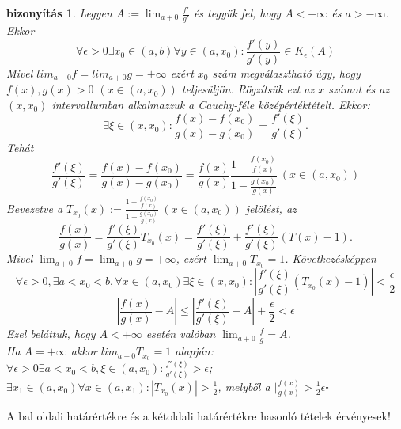 \documentclass{article}
\newcommand{\ob}{\hfill$\square$}
\newcommand{\di}{\displaystyle}
\theoremstyle{magyar}
\newtheorem{bi}{bizonyítás}[section]
\begin{document}
  \begin{bi}
    Legyen $A:=\di\lim_{a+0}\frac{f'}{g'}$ és tegyük fel, hogy $A<+\infty$ és 
    $a>-\infty$. Ekkor
    \[\forall\epsilon>0\exists x_0\in(a,b)\forall y\in(a,x_0):\frac{f'(y)}{g'(y)}\in K_\epsilon(A) \]
    Mivel $\di lim_{a+0}f=lim_{a+0}g=+\infty$ ezért $x_0$ szám megválasztható úgy, 
    hogy $f(x),g(x)>0$ $(x\in(a,x_0))$ teljesüljön. Rögzítsük ezt az $x$ számot és
    az $(x,x_0)$ intervallumban alkalmazzuk a Cauchy-féle középértéktételt. Ekkor:
    \[\exists{\xi\in(x,x_0)}: \frac{f(x)-f(x_0)}{g(x)-g(x_0)}=\frac{f'(\xi)}{g'(\xi)}.\]
    Tehát  \[\frac{f'(\xi)}{g'(\xi)}=\frac{f(x)-f(x_0)}{g(x)-g(x_0)}=\frac{f(x)}{g(x)}\frac{1-  \frac{f(x_0)}{f(x)}}{1-\frac{g(x_0)}{g(x)}}\ (x\in(a,x_0))\]
    Bevezetve a $\di T_{x_0}(x):=\frac{1-\frac{f(x_0)}{f(x)}}{1-\frac{g(x_0)}{g(x)}}\ 
    (x\in(a,x_0))$ jelölést, az \[\di\frac{f(x)}{g(x)}=\frac{f'(\xi)}{g'(\xi)}T_{x_0}(x)=
    \frac{f'(\xi)}{g'(\xi)}+\frac{f'(\xi)}{g'(\xi)}(T(x)-1).\] Mivel $\di\lim_{a+0}
    f=\lim_{a+0}g=+\infty$, ezért $\di\lim_{a+0}T_{x_0}=1$. Következésképpen 
    \[\forall\epsilon>0,\exists{a<x_0<b},\forall x\in(a,x_0) \exists\xi\in(x,x_0):|\frac{f'(\xi)}{g'(\xi)}(T_{x_0}(x)-1)|<\frac{\epsilon}{2}\]
    \[|\frac{f(x)}{g(x)}-A|\le|\frac{f'(\xi)}{g'(\xi)}-A|+\frac{\epsilon}{2}<\epsilon\]
    Ezel beláttuk, hogy $A<+\infty$ esetén valóban $\di\lim_{a+0}\frac{f}{g}=A$. \\
    Ha  $A=+\infty$ akkor $lim_{a+0}T_{x_0}=1$ alapján:\\
    $\di\forall \epsilon>0\exists a<x_0<b,\xi\in(a,x_0):\frac{f'(\xi)}{g'(\xi)}>\epsilon$;\\
    $\exists x_1\in(a,x_0)\forall x\in(a,x_1): |T_{x_0}(x)|>\frac{1}{2}$, melyből a $\di|\frac{f(x)}{g(x)}>\frac1{2}\epsilon$\ob
  \end{bi}
  A bal oldali határértékre és a kétoldali határértékre hasonló tételek érvényesek!\\
  \newpage
\end{document}
